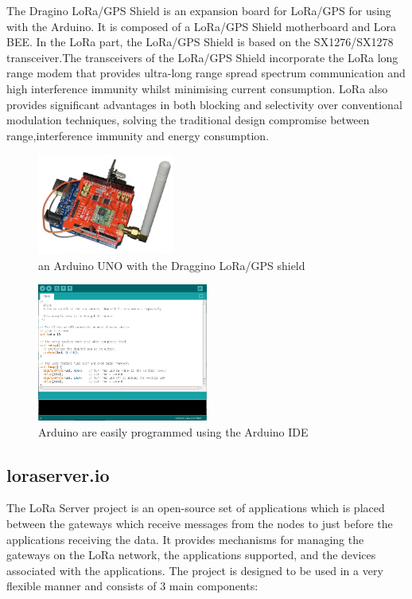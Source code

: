 The Dragino LoRa/GPS Shield \cite{dragino} is an expansion board for LoRa/GPS for using with the Arduino. It is composed of a LoRa/GPS Shield motherboard and Lora BEE. In the LoRa part, the LoRa/GPS Shield is based on the SX1276/SX1278 transceiver.The transceivers of the LoRa/GPS Shield incorporate the LoRa long range modem that provides ultra-long range spread spectrum communication and high interference immunity whilst minimising current consumption. LoRa also provides significant advantages in both blocking and selectivity over conventional modulation techniques, solving the traditional design compromise between range,interference immunity and energy consumption.

\begin{figure}[H]
    \centering
    \includegraphics[width=0.4\textwidth]{images/arduino.jpg}
    \caption{an Arduino UNO with the Draggino LoRa/GPS shield \cite{dragino}}
    \label{fig:Arduino}
\end{figure}

\begin{figure}[H]
    \centering
    \includegraphics[width=0.5\textwidth]{images/arduino_ide.png}
    \caption{Arduino are easily programmed using the Arduino IDE \cite{arduino}}
    \label{fig:Arduino_ide}
\end{figure}

\subsection{loraserver.io}

The LoRa Server project\cite{loraserver} is an open-source set of applications which is placed between the gateways which receive messages from the nodes to just before the applications receiving the data. It provides mechanisms for managing the gateways on the LoRa network, the applications supported, and the devices associated with the applications.
The project is designed to be used in a very flexible manner and consists of 3 main components:

